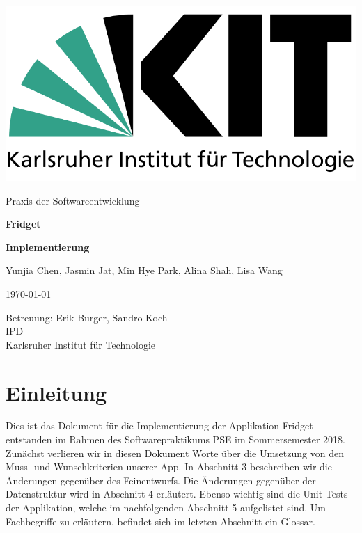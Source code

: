 \documentclass[a4paper]{scrreprt}
\begin{document}
	
	\begin{flushright}
		\includegraphics[scale = 0.2]{kit-logo.png}\\[0.5cm]
	\end{flushright}
	\vspace*{2cm}
	
	\begin{center}
		\large Praxis der Softwareentwicklung
		\vspace*{1.5cm}
		
		\textbf{\huge Fridget}
		\vspace*{1cm}
		
		\textbf{\Large Implementierung}
		\vspace*{2cm}
		
		Yunjia Chen, Jasmin Jat, Min Hye Park, Alina Shah, Lisa Wang
		\vspace*{1cm}
		
		\today
		\vspace*{2.5cm}
		
		Betreuung: Erik Burger, Sandro Koch\\[0.5cm]
		IPD\\[0.5cm]
		
		Karlsruher Institut für Technologie
		
	\end{center}
	
	\thispagestyle{empty}
	
	\tableofcontents
	
	\chapter{Einleitung}
	Dies ist das Dokument für die Implementierung der Applikation Fridget – entstanden im Rahmen
	des Softwarepraktikums PSE im Sommersemester 2018.
	Zunächst verlieren wir in diesen Dokument Worte über die Umsetzung von den Muss- und Wunschkriterien unserer App.
	In Abschnitt 3 beschreiben wir die Änderungen gegenüber des Feinentwurfs.
	Die Änderungen gegenüber der Datenstruktur wird in Abschnitt 4 erläutert.
	Ebenso wichtig sind die Unit Tests der Applikation, welche im nachfolgenden Abschnitt 5 aufgelistet sind.
	Um Fachbegriffe zu erläutern, befindet sich im letzten Abschnitt ein Glossar.
	
\end{document}
